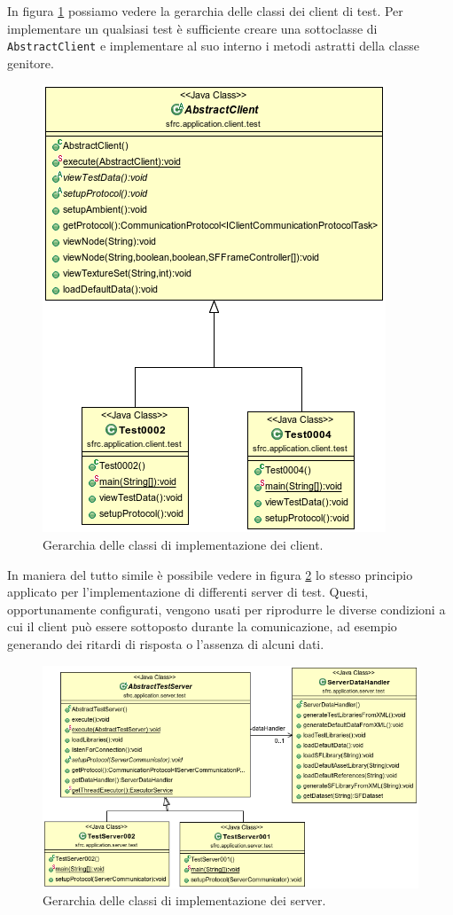 In figura \ref{f:abstractclient} possiamo vedere la gerarchia delle classi dei client di test. Per implementare un qualsiasi test \`e sufficiente creare una sottoclasse di \texttt{AbstractClient} e implementare al suo interno i metodi astratti della classe genitore. 
\begin{figure}
\begin{center}
\includegraphics[scale=0.85]{Immagini/abstractclient}
\caption{Gerarchia delle classi di implementazione dei client.\label{f:abstractclient}} 
\end{center} 
\end{figure}
In maniera del tutto simile \`e possibile vedere in figura \ref{f:abstractserver} lo stesso principio applicato per l'implementazione di differenti server di test. Questi, opportunamente configurati, vengono usati per riprodurre le diverse condizioni a cui il client pu\`o essere sottoposto durante la comunicazione, ad esempio generando dei ritardi di risposta o l'assenza di alcuni dati.
\begin{figure}[t]
\begin{center}
\includegraphics[scale=0.75]{Immagini/abstractserver}
\caption{Gerarchia delle classi di implementazione dei server.\label{f:abstractserver}} 
\end{center} 
\end{figure}
